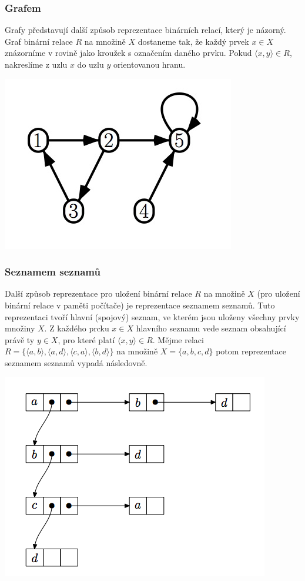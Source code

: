 \documentclass[12pt,a4paper]{article}
\begin{document}
\subsubsection{Grafem}
Grafy představují další způsob reprezentace binárních relací, který je názorný. Graf binární relace $R$ na množině $X$ dostaneme tak, že každý prvek $x \in X$ znázorníme v rovině jako kroužek s označením daného prvku. Pokud $\langle x,y \rangle \in R$, nakreslíme z uzlu $x$ do uzlu $y$ orientovanou hranu.

\begin{center}
	\includegraphics[scale=0.6]{images/1/RelationGraph}
\end{center}

\subsubsection{Seznamem seznamů}
Další způsob reprezentace pro uložení binární relace $R$ na množině $X$ (pro uložení binární relace v paměti počítače) je reprezentace seznamem seznamů. Tuto reprezentaci tvoří hlavní (spojový) seznam, ve kterém jsou uloženy všechny prvky množiny $X$. Z každého prcku $x \in X$ hlavního seznamu vede seznam obsahující právě ty $y \in X$, pro které platí $\langle x, y \rangle \in R$. Mějme relaci $R = \{\langle a, b\rangle,\langle a, d\rangle,\langle c, a\rangle,\langle b, d\rangle\}$ na množině $X = \{a,b,c,d\}$ potom reprezentace seznamem seznamů vypadá následovně.

\begin{center}
	\includegraphics[scale=0.6]{images/1/RelationList}
\end{center}
\end{document}

